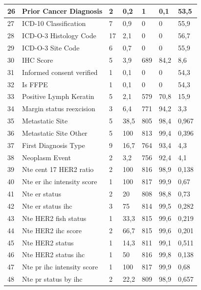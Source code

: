 \begin{table}[!htb]
	\footnotesize
	\centering
	\begin{threeparttable}
		\begin{tabular}{p{0.5cm} p{4cm} p{1.5cm} p{2cm} p{1.5cm} p{2cm} p{1.5cm}} \toprule
					26	&	Prior Cancer Diagnosis	&	2	&	0,2	&	1	&	0,1	&	53,5
		\\ \hline	27	&	ICD-10 Classification	&	7	&	0,9	&	0	&	0	&	55,9
		\\ \hline	28	&	ICD-O-3 Histology Code	&	17	&	2,1	&	0	&	0	&	56,7
		\\ \hline	29	&	ICD-O-3 Site Code	&	6	&	0,7	&	0	&	0	&	55,9
		\\ \hline	30	&	IHC Score	&	5	&	3,9	&	689	&	84,2	&	8,6
		\\ \hline	31	&	Informed consent verified	&	1	&	0,1	&	0	&	0	&	54,3
		\\ \hline	32	&	Is FFPE	&	1	&	0,1	&	0	&	0	&	54,3
		\\ \hline	33	&	Positive Lymph Keratin	&	5	&	2,1	&	579	&	70,8	&	15,9
		\\ \hline	34	&	Margin status reexcision	&	3	&	6,4	&	771	&	94,2	&	3,3
		\\ \hline	35	&	Metastatic Site	&	5	&	38,5	&	805	&	98,4	&	0,967
		\\ \hline	36	&	Metastatic Site Other	&	5	&	100	&	813	&	99,4	&	0,396
		\\ \hline	37	&	First Diagnosis Type	&	9	&	16,7	&	764	&	93,4	&	4,3
		\\ \hline	38	&	Neoplasm Event 	&	2	&	3,2	&	756	&	92,4	&	4,1
		\\ \hline	39	&	Nte cent 17 HER2 ratio	&	2	&	100	&	816	&	98,9	&	0,138
		\\ \hline	40	&	Nte er ihc intensity score	&	1	&	100	&	817	&	99,9	&	0,67
		\\ \hline	41	&	Nte er status	&	2	&	20	&	808	&	98,8	&	0,73
		\\ \hline	42	&	Nte er status ihc 	&	3	&	75	&	814	&	99,5	&	0,282
		\\ \hline	43	&	Nte HER2 fish status	&	1	&	33,3	&	815	&	99,6	&	0,219
		\\ \hline	44	&	Nte HER2 ihc score	&	2	&	66,7	&	815	&	99,6	&	0,201
		\\ \hline	45	&	Nte HER2 status	&	1	&	14,3	&	811	&	99,1	&	0,511
		\\ \hline	46	&	Nte HER2 status ihc 	&	1	&	50	&	816	&	99,8	&	0,138
		\\ \hline	47	&	Nte pr ihc intensity score	&	1	&	100	&	817	&	99,9	&	0,68
		\\ \hline	48	&	Nte pr status by ihc	&	2	&	22,2	&	809	&	98,9	&	0,657

\end{tabular}
\end{threeparttable}
\end{table}

